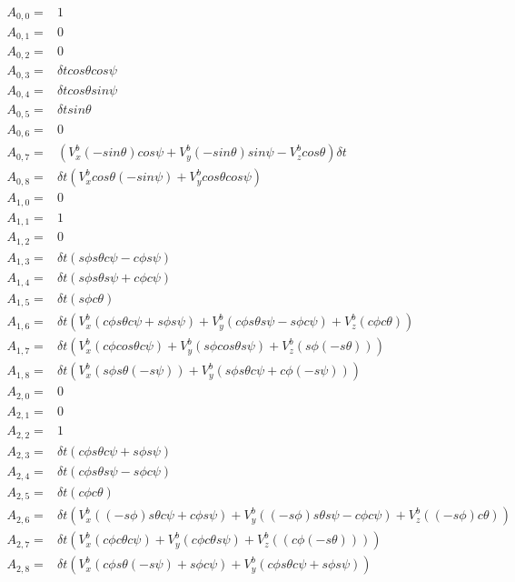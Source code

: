 \documentclass[conference]{IEEEtran}
\begin{document}
\begin{align*}
A_{0,0} =& 1\\
A_{0,1} =& 0\\
A_{0,2} =& 0\\
A_{0,3} =& \delta t cos \theta cos \psi \\
A_{0,4} =& \delta t cos \theta sin \psi \\
A_{0,5} =&  \delta t sin \theta \\
A_{0,6} =&  0 \\
A_{0,7} =& (V_x^b (-sin \theta) cos \psi + V_y^b (-sin \theta) sin \psi - V_z^b cos \theta) \delta t \\
A_{0,8} =& \delta t (V_x^b cos \theta (-sin \psi ) + V_y^b cos \theta cos \psi)\\
A_{1,0} =& 0\\
A_{1,1} =& 1\\
A_{1,2} =& 0\\
A_{1,3} =& \delta t ( s \phi s\theta c\psi - c \phi s\psi)  \\
A_{1,4} =& \delta t  (s\phi s\theta s\psi + c\phi c\psi) \\
A_{1,5} =&  \delta t (s \phi c \theta) \\
A_{1,6} =&  \delta t (V_x^b (c\phi s \theta c \psi +s\phi s\psi) + V_y^b (c\phi s \theta s \psi -s\phi c\psi) + V_z^b(c \phi c \theta)) \\
A_{1,7} =&   \delta t (V_x^b(c\phi cos \theta c \psi) + V_y^b(s \phi cos \theta s \psi) + V_z^b(s \phi ( -s \theta)))\\
A_{1,8} =& \delta t (V_x^b(s\phi s\theta (-s\psi)) + V_y^b(s \phi s \theta c \psi + c\phi (-s\psi)))\\
A_{2,0} =& 0\\
A_{2,1} =& 0\\
A_{2,2} =& 1\\
A_{2,3} =& \delta t  (c \phi s \theta c \psi + s \phi s \psi)   \\
A_{2,4} =& \delta t ( c \phi s \theta s\psi - s \phi c\psi) \\
A_{2,5} =&  \delta t (c \phi c \theta) \\
A_{2,6} =&  \delta t (V_x^b ((-s \phi)s\theta c \psi + c \phi s \psi) + V_y^b ((-s \phi) s \theta s \psi - c \phi c \psi) + V_z^b((-s \phi) c \theta)) \\
A_{2,7} =&   \delta t (V_x^b(c\phi c\theta c\psi) + V_y^b(c\phi c\theta s\psi) + V_z^b((c \phi (-s \theta))))\\
A_{2,8} =& \delta t (V_x^b(c\phi s \theta (-s\psi) +s\phi c \psi) + V_y^b(c \phi s \theta c \psi + s \phi s \psi))\\
\end{align*}
\end{document}
